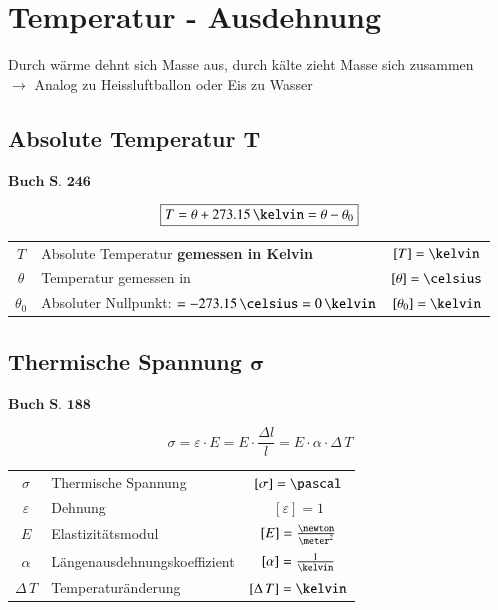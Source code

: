 \section{Temperatur - Ausdehnung}

Durch wärme dehnt sich Masse aus, durch kälte zieht Masse sich zusammen \\
$\rightarrow$ Analog zu Heissluftballon oder Eis zu Wasser

\subsection[Absolute Temperatur]{Absolute Temperatur $\bm{T}$}

\begin{flushright}
	$\boxed{\textbf{Buch S. 246}}$
\end{flushright}

$$ \boxed{ T = \theta + 273.15 \, \kelvin = \theta - \theta_0 } $$

\begin{tabular}{c l c}
		$T$ 		& Absolute Temperatur \textbf{gemessen in Kelvin}				& $[T] =\kelvin$  		\\
		$\theta$ 	& Temperatur gemessen in \celsius 								& $[\theta] = \celsius$ \\
		$\theta_0$ 	& Absoluter Nullpunkt: $= -273.15 \, \celsius = 0 \, \kelvin$	& $[\theta_0] = \kelvin$
\end{tabular}

\subsection[Thermische Spannung]{Thermische Spannung $\bm{\sigma}$}
\begin{flushright}
	$\boxed{\textbf{Buch S. 188}}$
\end{flushright}

$$\boxed{ \sigma = \varepsilon \cdot E = E \cdot \frac{\Delta l}{l} =  E \cdot \alpha \cdot \Delta \, T } $$

\renewcommand{\arraystretch}{1.3}
\begin{tabular}{c l c}
	$\sigma$ 		& Thermische Spannung 			& $[\sigma] = \pascal$ 				\\
	$\varepsilon$ 	& Dehnung 						& $[\varepsilon] = 1$ 				\\
	$E$ 			& Elastizitätsmodul 			& $[E] = \frac{\newton}{\meter^2}$ 	\\
	$\alpha$ 		& Längenausdehnungskoeffizient 	& $[\alpha] = \frac{1}{\kelvin}$ 	\\ 
	$\Delta \, T $ 	& Temperaturänderung 			& $[\Delta \, T ] = \kelvin$ 		
\end{tabular}
\renewcommand{\arraystretch}{1}

